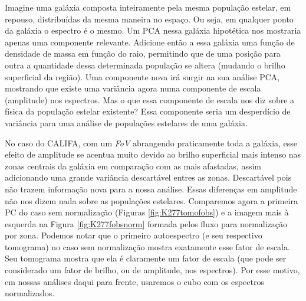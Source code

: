 Imagine uma galáxia composta inteiramente pela mesma população estelar, em repouso, distribuídas da mesma maneira no
espaço. Ou seja, em qualquer ponto da galáxia o espectro é o mesmo. Um PCA nessa galáxia hipotética nos mostraria apenas
uma componente relevante. Adicione então a essa galáxia uma função de densidade de massa em função do raio, permitindo
que de uma posição para outra a quantidade dessa determinada população se altera (mudando o brilho superficial da
região). Uma componente nova irá surgir na sua análise PCA, mostrando que existe uma variância agora numa componente de
escala (amplitude) nos espectros. Mas o que essa componente de escala nos diz sobre a física da população estelar
existente? Essa componente seria um desperdício de variância para uma análise de populações estelares de uma galáxia.

No caso do CALIFA, com um {\em FoV} abrangendo praticamente toda a galáxia, esse efeito de amplitude se acentua muito
devido ao brilho superficial mais intenso nas zonas centrais da galáxia em comparação com as mais afastadas, assim
adicionando uma grande variância descartável entres as zonas. Descartável pois não trazem informação nova para a nossa
análise. Essas diferenças em amplitude não nos dizem nada sobre as populações estelares. Comparemos agora a primeira PC
do caso sem normalização (Figuras \ref{fig:K277tomofobs}) e a imagem mais à esquerda na Figura
\ref{fig:K277fobsnorm} formada pelos fluxo para normalização por zona. Podemos notar que o primeiro autoespectro
(e seu respectivo tomograma) no caso sem normalização mostra exatamente esse fator de escala. Seu tomograma mostra que
ela é claramente um fator de escala (que pode ser considerado um fator de brilho, ou de amplitude, nos espectros). Por
esse motivo, em nossas análises daqui para frente, usaremos o cubo com os espectros normalizados.

